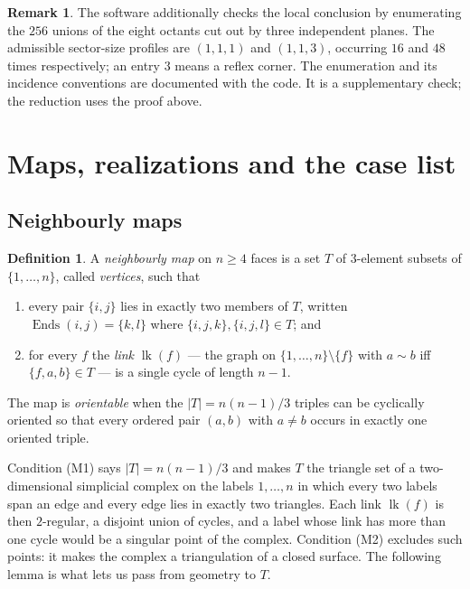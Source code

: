 \documentclass[11pt,reqno]{amsart}
\theoremstyle{plain}
\theoremstyle{definition}
\newtheorem{definition}[theorem]{Definition}
\newtheorem{remark}[theorem]{Remark}
\newcommand{\Ends}{\operatorname{Ends}}
\newcommand{\link}{\operatorname{lk}}
\begin{document}
\begin{remark}\label{rem:octants}
The software additionally checks the local conclusion by enumerating the $256$ unions of
the eight octants cut out by three independent planes. The admissible sector-size profiles
are $(1,1,1)$ and $(1,1,3)$, occurring $16$ and $48$ times respectively; an entry $3$
means a reflex corner. The enumeration and its incidence conventions are documented with
the code. It is a supplementary check; the reduction uses the proof above.
\end{remark}

\section{Maps, realizations and the case list}\label{sec:maps}

\subsection{Neighbourly maps}

\begin{definition}\label{def:map}
A \emph{neighbourly map} on $n\ge4$ faces is a set $T$ of $3$-element subsets of $\{1,\dots,n\}$,
called \emph{vertices}, such that
\begin{enumerate}[label=\textup{(M\arabic*)},leftmargin=3.2em]
\item every pair $\{i,j\}$ lies in exactly two members of $T$, written $\Ends(i,j)=\{k,l\}$ where
   $\{i,j,k\},\{i,j,l\}\in T$; and
\item for every $f$ the \emph{link} $\link(f)$ --- the graph on $\{1,\dots,n\}\setminus\{f\}$ with
   $a\sim b$ iff $\{f,a,b\}\in T$ --- is a single cycle of length $n-1$.
\end{enumerate}
The map is \emph{orientable} when the $|T|=n(n-1)/3$ triples can be cyclically oriented so that every
ordered pair $(a,b)$ with $a\ne b$ occurs in exactly one oriented triple.
\end{definition}

Condition (M1) says $|T|=n(n-1)/3$ and makes $T$ the triangle set of a two-dimensional simplicial
complex on the labels $1,\dots,n$ in which every two labels span an edge and every edge lies in
exactly two triangles. Each link $\link(f)$ is then $2$-regular, a disjoint union of cycles, and a
label whose link has more than one cycle would be a singular point of the complex. Condition (M2)
excludes such points: it makes the complex a triangulation of a closed surface. The following lemma
is what lets us pass from geometry to $T$.
\end{document}
